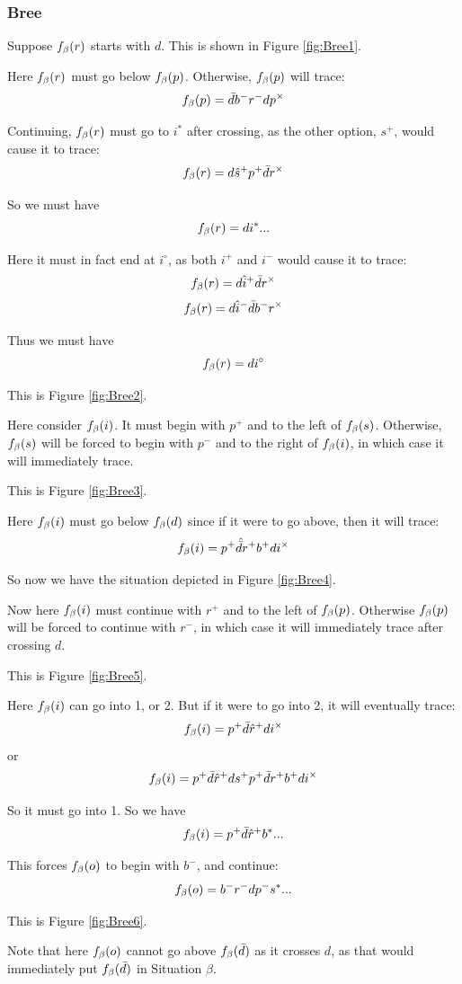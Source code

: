 \subsubsection{Bree} \label{Bree}

Suppose $f_\beta(r)$ starts with $d$. This is shown in Figure \ref{fig:Bree1}.

Here $f_\beta(r)$ must go below $f_\beta(p)$. Otherwise, $f_\beta(p)$ will trace:
\[
f_\beta(p) = \bar{d} b^- r^- d p^\times
\]

Continuing, $f_\beta(r)$ must go to $i^*$ after crossing, as the other option, $s^+$, would cause it to trace:
\[
f_\beta(r) = d \hat{s}^+ p^+ \bar{d} r^\times
\]

So we must have
\[
f_\beta(r) = d i^*...
\]

Here it must in fact end at $i^\circ$, as both $i^+$ and $i^-$ would cause it to trace:
\[
f_\beta(r) = d \hat{i}^+ \bar{d} r^\times
\]
\[
f_\beta(r) = d \hat{i}^- \bar{d} b^- r^\times
\]

Thus we must have
\[
f_\beta(r) = d i^\circ
\]

This is Figure \ref{fig:Bree2}.

Here consider $f_\beta(i)$. It must begin with $p^+$ and to the left of $f_\beta(s)$. Otherwise, $f_\beta(s)$ will be forced to begin with $p^-$ and to the right of $f_\beta(i)$, in which case it will immediately trace.

This is Figure \ref{fig:Bree3}.

Here $f_\beta(i)$ must go below $f_\beta(d)$ since if it were to go above, then it will trace:
\[
f_\beta(i) = p^+ \hat{\bar{d}} r^+ b^+ d  i^\times
\]

So now we have the situation depicted in Figure \ref{fig:Bree4}.

Now here $f_\beta(i)$ must continue with $r^+$ and to the left of $f_\beta(p)$. Otherwise $f_\beta(p)$ will be forced to continue with $r^-$, in which case it will immediately trace after crossing $d$. 

This is Figure \ref{fig:Bree5}.

Here $f_\beta(i)$ can go into 1, or 2. But if it were to go into 2, it will eventually trace:
\[
f_\beta(i) = p^+ \bar{d} \hat{r}^+ d i^\times
\]
or
\[
f_\beta(i) = p^+ \bar{d} \hat{r}^+ d s^+ p^+ \bar{d} r^+ b^+ d i^\times
\]

So it must go into 1. So we have
\[
f_\beta(i) = p^+ \bar{d} \hat{r}^+  b^*...
\]

This forces $f_\beta(o)$ to begin with $b^-$, and continue:
\[
f_\beta(o) = b^- r^- d p^- s^*...
\]

This is Figure \ref{fig:Bree6}.

Note that here $f_\beta(o)$ cannot go above $f_\beta(\bar{d})$ as it crosses $d$, as that would immediately put $f_\beta(\bar{d})$ in Situation $\beta$.

